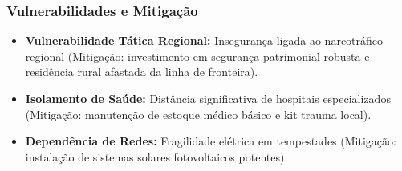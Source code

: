 \subsubsection{Vulnerabilidades e
Mitigação}

\begin{itemize}
\tightlist
\item
  \textbf{Vulnerabilidade Tática Regional:} Insegurança ligada ao
  narcotráfico regional (Mitigação: investimento em segurança
  patrimonial robusta e residência rural afastada da linha de
  fronteira).
\item
  \textbf{Isolamento de Saúde:} Distância significativa de hospitais
  especializados (Mitigação: manutenção de estoque médico básico e kit
  trauma local).
\item
  \textbf{Dependência de Redes:} Fragilidade elétrica em tempestades
  (Mitigação: instalação de sistemas solares fotovoltaicos potentes).
\end{itemize}

